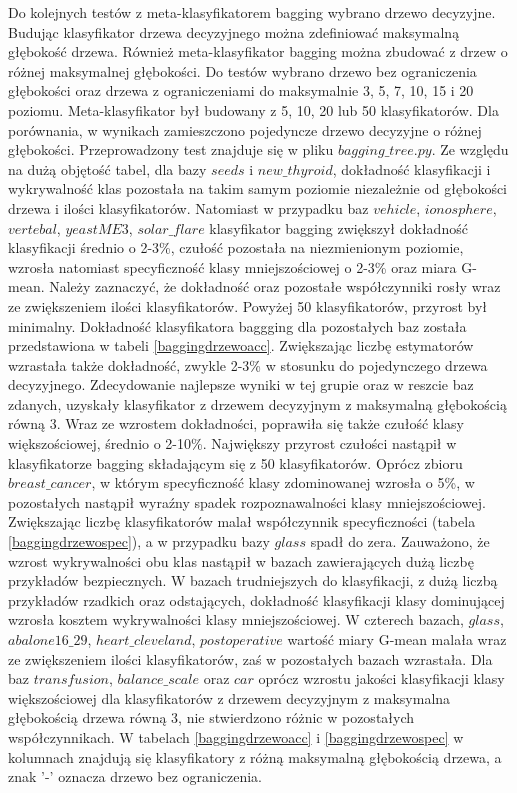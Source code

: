 Do kolejnych testów z meta-klasyfikatorem bagging wybrano drzewo decyzyjne. Budując klasyfikator drzewa decyzyjnego można zdefiniować maksymalną głębokość drzewa. Również meta-klasyfikator bagging można zbudować z drzew o różnej maksymalnej głębokości. Do testów wybrano drzewo bez ograniczenia głębokości oraz drzewa z ograniczeniami do maksymalnie 3, 5, 7, 10, 15 i 20 poziomu. Meta-klasyfikator był budowany z 5, 10, 20 lub 50 klasyfikatorów. Dla porównania, w wynikach zamieszczono pojedyncze drzewo decyzyjne o różnej głębokości. Przeprowadzony test znajduje się w pliku $bagging\_tree.py$. Ze względu na dużą objętość tabel, dla bazy $seeds$ i $new\_thyroid$, dokładność klasyfikacji i wykrywalność klas pozostała na takim samym poziomie niezależnie od głębokości drzewa i ilości klasyfikatorów. Natomiast w przypadku baz $vehicle$, $ionosphere$, $vertebal$, $yeastME3$, $solar\_flare$ klasyfikator bagging zwiększył dokładność klasyfikacji średnio o 2-3\%, czułość pozostała na niezmienionym poziomie, wzrosła natomiast specyficzność klasy mniejszościowej o 2-3\% oraz miara G-mean. Należy zaznaczyć, że dokładność oraz pozostałe współczynniki rosły wraz ze zwiększeniem ilości klasyfikatorów. Powyżej 50 klasyfikatorów, przyrost był minimalny. Dokładność klasyfikatora baggging dla pozostałych baz została przedstawiona w tabeli \ref{baggingdrzewoacc}. Zwiększając liczbę estymatorów wzrastała także dokładność, zwykle 2-3\% w stosunku do pojedynczego drzewa decyzyjnego. Zdecydowanie najlepsze wyniki w tej grupie oraz w reszcie baz zdanych, uzyskały klasyfikator z drzewem decyzyjnym z maksymalną głębokością równą 3. Wraz ze wzrostem dokładności, poprawiła się także czułość klasy większościowej, średnio o 2-10\%. Największy przyrost czułości nastąpił w klasyfikatorze bagging składającym się z 50 klasyfikatorów. Oprócz zbioru $breast\_cancer$, w którym specyficzność klasy zdominowanej wzrosła o 5\%, w pozostałych nastąpił wyraźny spadek rozpoznawalności klasy mniejszościowej. Zwiększając liczbę klasyfikatorów malał współczynnik specyficzności (tabela \ref{baggingdrzewospec}), a w przypadku bazy $glass$ spadł do zera. Zauważono, że wzrost wykrywalności obu klas nastąpił w bazach zawierających dużą liczbę przykładów bezpiecznych. W bazach trudniejszych do klasyfikacji, z dużą liczbą przykładów rzadkich oraz odstających, dokładność klasyfikacji klasy dominującej wzrosła kosztem wykrywalności klasy mniejszościowej. W czterech bazach, $glass$, $abalone16\_29$, $heart\_cleveland$, $postoperative$ wartość miary G-mean malała wraz ze zwiększeniem ilości klasyfikatorów, zaś w pozostałych bazach wzrastała. Dla baz $transfusion$, $balance\_scale$ oraz $car$ oprócz wzrostu jakości klasyfikacji klasy większościowej dla klasyfikatorów z drzewem decyzyjnym z maksymalna głębokością drzewa równą 3, nie stwierdzono różnic w pozostałych współczynnikach. W tabelach \ref{baggingdrzewoacc} i \ref{baggingdrzewospec} w kolumnach znajdują się klasyfikatory z różną maksymalną głębokością drzewa, a znak '-' oznacza drzewo bez ograniczenia.
